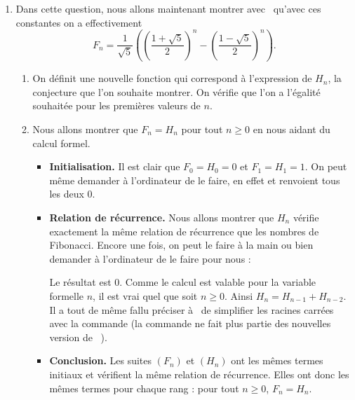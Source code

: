 \documentclass[class=report,crop=false]{standalone}
\begin{document}
\begin{enumerate}
  
  \item  
  Dans cette question, nous allons maintenant montrer avec \Sage\ qu'avec ces constantes on a effectivement 
  $$F_n = \frac{1}{\sqrt5}\left(\left(\frac{1+\sqrt5}{2}\right)^n- 
  \left(\frac{1-\sqrt5}{2}\right)^n\right).$$

  \begin{enumerate}
    \item On définit une nouvelle fonction  qui correspond à l'expression de $H_n$,
    la conjecture que l'on souhaite montrer.
    On vérifie que l'on a l'égalité souhaitée pour les premières valeurs de $n$.
    
    
    \item Nous allons montrer que $F_n=H_n$ pour tout $n\ge0$ en nous aidant du calcul formel.
    \begin{itemize}
      \item \textbf{Initialisation.}
      Il est clair que $F_0=H_0=0$ et $F_1=H_1=1$.
      On peut même demander à l'ordinateur de le faire, en effet
       et 
      renvoient tous les deux $0$.
      
      \item \textbf{Relation de récurrence.}
      Nous allons montrer que $H_n$ vérifie exactement la même relation de récurrence que les nombres de Fibonacci.
      Encore une fois, on peut le faire à la main ou bien demander à l'ordinateur de le faire pour nous :
      

      
      Le résultat est $0$. Comme le calcul est valable pour la variable formelle $n$,
      il est vrai quel que soit $n\ge0$. Ainsi $H_n=H_{n-1}+H_{n-2}$.    
      Il a tout de même fallu préciser à \Sage\ de simplifier les racines carrées
      avec la commande  (la commande  ne fait plus partie des nouvelles version de \Sage\ ).   
      
      \item \textbf{Conclusion.} 
      Les suites $(F_n)$ et $(H_n)$ ont les mêmes termes initiaux et 
      vérifient la même relation de récurrence. Elles ont donc les mêmes termes pour chaque rang :
      pour tout $n\ge0$, $F_n=H_n$.
      
      
    \end{itemize}

  \end{enumerate}
  
\end{enumerate}
\end{document}
